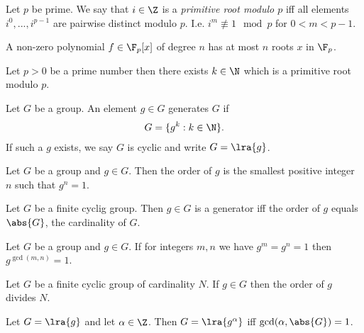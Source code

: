 \documentclass{article}
\begin{document}
\begin{definition}
	Let $p$ be prime. We say that $i\in\Z$ is a \emph{primitive root modulo $p$}
	iff all elements $i^0,...,i^{p-1}$ are pairwise distinct modulo $p$. I.e.
	$i^m\not\equiv 1\mod p$ for $0<m<p-1$.
\end{definition}



\begin{theorem}
	A non-zero polynomial $f\in\F_p[x]$ of degree $n$ has at most $n$ roots $x$
	in $\F_p$.
\end{theorem}

\begin{theorem}
	Let $p>0$ be a prime number then there exists $k\in\N$ which is a
	primitive root modulo $p$.
\end{theorem}

\begin{definition}
	Let $G$ be a group. An element $g\in G$ generates $G$ if
	\begin{align*}
		G = \{g^k : k \in \N\}.
	\end{align*}
	If such a $g$ exists, we say $G$ is cyclic and write $G=\lra{g}$.
\end{definition}

\begin{definition}
	Let $G$ be a group and $g\in G$. Then the order of $g$ is the smallest positive
	integer $n$ such that $g^n = 1$.
\end{definition}

\begin{corollary}
	Let $G$ be a finite cyclig group. Then $g\in G$ is a generator iff the order of
	$g$ equals $\abs{G}$, the cardinality of $G$.
\end{corollary}

\begin{lemma}
	Let $G$ be a group and $g\in G$. If for integers $m,n$ we have $g^m=g^n=1$
	then $g^{\gcd(m,n)}=1$.
\end{lemma}

\begin{theorem}
	Let $G$ be a finite cyclic group of cardinality $N$. If $g\in G$ then
	the order of $g$ divides $N$.
\end{theorem}

\begin{theorem}
	Let $G=\lra{g}$ and let $\alpha\in\Z$. Then $G=\lra{g^\alpha}$ iff
	$\gcd(\alpha,\abs{G})=1$.
\end{theorem}
\end{document}
